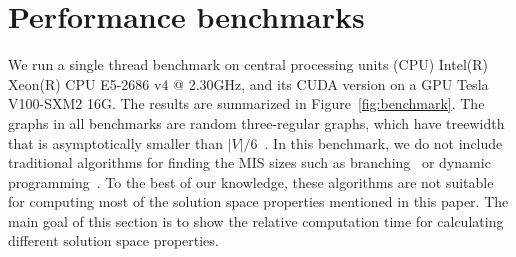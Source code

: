 \documentclass[onefignum, onetabnum]{siamart190516}
\newcommand{\<}{\langle}
\renewcommand{\>}{\rangle}
\begin{document}
\section{Performance benchmarks}\label{sec:benchmark}
We run a single thread benchmark on central processing units (CPU) Intel(R) Xeon(R) CPU E5-2686 v4 @ 2.30GHz, and its CUDA version on a GPU Tesla V100-SXM2 16G.
The results are summarized in Figure~\ref{fig:benchmark}.
The graphs in all benchmarks are random three-regular graphs, which have treewidth that is asymptotically smaller than $|V|/6$~\cite{Fomin2006}.
In this benchmark, we do not include traditional algorithms for finding the MIS sizes such as branching~\cite{Tarjan1977, Robson1986} or dynamic programming~\cite{Courcelle1990, Fomin2013}.
To the best of our knowledge, these algorithms are not suitable for computing most of the solution space properties mentioned in this paper.
The main goal of this section is to show the relative computation time for calculating different solution space properties.
\end{document}
